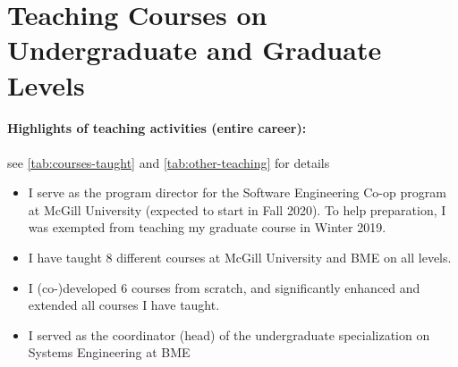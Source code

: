 \section{Teaching Courses on Undergraduate and Graduate Levels}

\paragraph{Highlights of teaching activities (entire career):} see \autoref{tab:courses-taught} and \autoref{tab:other-teaching} for details
\begin{itemize}[leftmargin=0.5cm]
\item  
I serve as the program director for the Software Engineering Co-op program at McGill University (expected to start in Fall 2020). To help preparation, I was exempted from teaching my graduate course in Winter 2019.  
\item I have taught 8 different courses at McGill University and BME on all levels. 
\item I (co-)developed 6 courses from scratch, and significantly enhanced and extended all courses I have taught. 
\item I served as the coordinator (head) of the undergraduate specialization on Systems Engineering at BME
\end{itemize}

